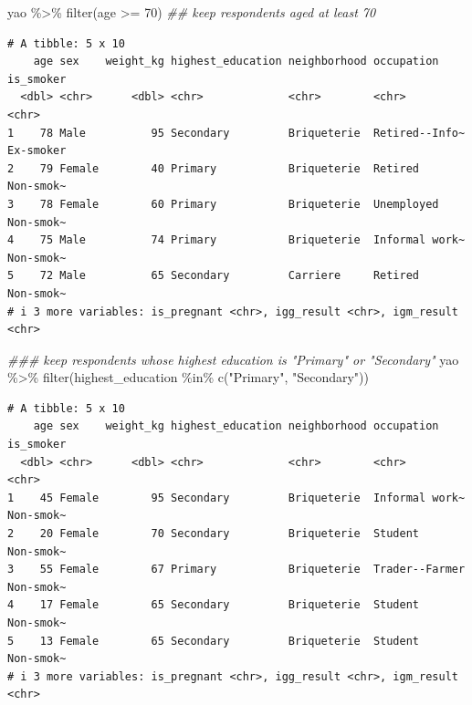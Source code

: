 \documentclass[
  letterpaper,
  DIV=11,
  numbers=noendperiod]{scrreprt}
\newenvironment{Shaded}{\begin{snugshade}}{\end{snugshade}}
\newcommand{\DecValTok}[1]{\textcolor[rgb]{0.68,0.00,0.00}{#1}}
\newcommand{\DocumentationTok}[1]{\textcolor[rgb]{0.37,0.37,0.37}{\textit{#1}}}
\newcommand{\FunctionTok}[1]{\textcolor[rgb]{0.28,0.35,0.67}{#1}}
\newcommand{\NormalTok}[1]{\textcolor[rgb]{0.00,0.23,0.31}{#1}}
\newcommand{\SpecialCharTok}[1]{\textcolor[rgb]{0.37,0.37,0.37}{#1}}
\newcommand{\StringTok}[1]{\textcolor[rgb]{0.13,0.47,0.30}{#1}}
\begin{document}
\begin{Shaded}
\begin{Highlighting}[]
\NormalTok{yao }\SpecialCharTok{\%\textgreater{}\%} \FunctionTok{filter}\NormalTok{(age }\SpecialCharTok{\textgreater{}=} \DecValTok{70}\NormalTok{) }\DocumentationTok{\#\# keep respondents aged at least 70}
\end{Highlighting}
\end{Shaded}

\begin{verbatim}
# A tibble: 5 x 10
    age sex    weight_kg highest_education neighborhood occupation     is_smoker
  <dbl> <chr>      <dbl> <chr>             <chr>        <chr>          <chr>    
1    78 Male          95 Secondary         Briqueterie  Retired--Info~ Ex-smoker
2    79 Female        40 Primary           Briqueterie  Retired        Non-smok~
3    78 Female        60 Primary           Briqueterie  Unemployed     Non-smok~
4    75 Male          74 Primary           Briqueterie  Informal work~ Non-smok~
5    72 Male          65 Secondary         Carriere     Retired        Non-smok~
# i 3 more variables: is_pregnant <chr>, igg_result <chr>, igm_result <chr>
\end{verbatim}

\begin{Shaded}
\begin{Highlighting}[]
\DocumentationTok{\#\#\# keep respondents whose highest education is "Primary" or "Secondary"}
\NormalTok{yao }\SpecialCharTok{\%\textgreater{}\%} \FunctionTok{filter}\NormalTok{(highest\_education }\SpecialCharTok{\%in\%} \FunctionTok{c}\NormalTok{(}\StringTok{"Primary"}\NormalTok{, }\StringTok{"Secondary"}\NormalTok{))}
\end{Highlighting}
\end{Shaded}

\begin{verbatim}
# A tibble: 5 x 10
    age sex    weight_kg highest_education neighborhood occupation     is_smoker
  <dbl> <chr>      <dbl> <chr>             <chr>        <chr>          <chr>    
1    45 Female        95 Secondary         Briqueterie  Informal work~ Non-smok~
2    20 Female        70 Secondary         Briqueterie  Student        Non-smok~
3    55 Female        67 Primary           Briqueterie  Trader--Farmer Non-smok~
4    17 Female        65 Secondary         Briqueterie  Student        Non-smok~
5    13 Female        65 Secondary         Briqueterie  Student        Non-smok~
# i 3 more variables: is_pregnant <chr>, igg_result <chr>, igm_result <chr>
\end{verbatim}
\end{document}
